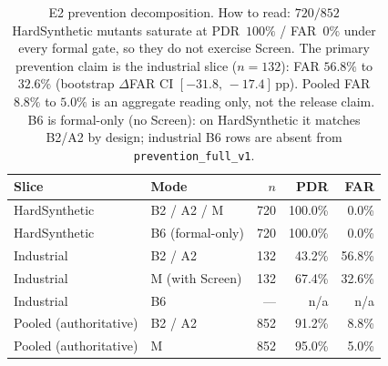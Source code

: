 \begin{table}[t]
  \centering
  \caption{E2 prevention decomposition.
    How to read: $720/852$ HardSynthetic mutants saturate at PDR~$100\%$ /
    FAR~$0\%$ under every formal gate, so they do not exercise Screen.
    The primary prevention claim is the industrial slice ($n{=}132$): FAR
    $56.8\%$ to $32.6\%$ (bootstrap $\Delta$FAR CI
    $[-31.8,\,-17.4]$\,pp).
    Pooled FAR $8.8\%$ to $5.0\%$ is an aggregate reading only, not the release
    claim.
    B6 is formal-only (no Screen): on HardSynthetic it matches B2/A2 by design;
    industrial B6 rows are absent from \texttt{prevention\_full\_v1}.}
  \label{tab:e2-decomp-availability}
  \footnotesize
  \renewcommand{\arraystretch}{1.08}
  \begin{tabular}{@{}llrrr@{}}
    \toprule
    Slice & Mode & $n$ & PDR & FAR \\
    \midrule
    HardSynthetic & B2 / A2 / M & 720 & 100.0\% & 0.0\% \\
    HardSynthetic & B6 (formal-only) & 720 & 100.0\% & 0.0\% \\
    Industrial & B2 / A2 & 132 & 43.2\% & 56.8\% \\
    Industrial & M (with Screen) & 132 & 67.4\% & 32.6\% \\
    Industrial & B6 & --- & n/a & n/a \\
    Pooled (authoritative) & B2 / A2 & 852 & 91.2\% & 8.8\% \\
    Pooled (authoritative) & M & 852 & 95.0\% & 5.0\% \\
    \bottomrule
  \end{tabular}
\end{table}
